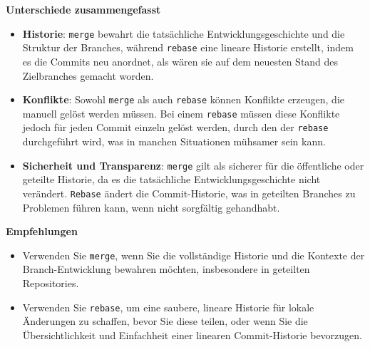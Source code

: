 \documentclass{vorlage-design-main}
\begin{document}
\textbf{Unterschiede zusammengefasst}

\begin{itemize}

\item
  \textbf{Historie}: \verb|merge| bewahrt die
  tatsächliche Entwicklungsgeschichte und die Struktur der Branches,
  während \verb|rebase| eine lineare Historie
  erstellt, indem es die Commits neu anordnet, als wären sie auf dem
  neuesten Stand des Zielbranches gemacht worden.
\item
  \textbf{Konflikte}: Sowohl \verb|merge| als auch
  \verb|rebase| können Konflikte erzeugen, die
  manuell gelöst werden müssen. Bei einem
  \verb|rebase| müssen diese Konflikte jedoch für
  jeden Commit einzeln gelöst werden, durch den der
  \verb|rebase| durchgeführt wird, was in manchen
  Situationen mühsamer sein kann.
\item
  \textbf{Sicherheit und Transparenz}: \verb|merge|
  gilt als sicherer für die öffentliche oder geteilte Historie, da es
  die tatsächliche Entwicklungsgeschichte nicht verändert.
  \verb|Rebase| ändert die Commit-Historie, was in
  geteilten Branches zu Problemen führen kann, wenn nicht sorgfältig
  gehandhabt.
\end{itemize}

\textbf{Empfehlungen}

\begin{itemize}

\item
  Verwenden Sie \verb|merge|, wenn Sie die
  vollständige Historie und die Kontexte der Branch-Entwicklung bewahren
  möchten, insbesondere in geteilten Repositories.
\item
  Verwenden Sie \verb|rebase|, um eine saubere,
  lineare Historie für lokale Änderungen zu schaffen, bevor Sie diese
  teilen, oder wenn Sie die Übersichtlichkeit und Einfachheit einer
  linearen Commit-Historie bevorzugen.
\end{itemize} %


\clearpage
\printbibliography
\end{document}
